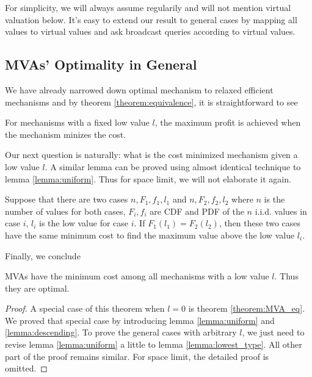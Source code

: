 For simplicity, we will always assume regularily and will not mention virtual
valuation below.  It's easy to extend our result to general cases by mapping
all values to virtual values and ask broadcast queries according to virtual
values.

\subsection{MVAs' Optimality in General}

We have already narrowed down optimal mechanism to
relaxed efficient mechanisms and by theorem \ref{theorem:equivalence},
it is straightforward to see

\begin{corollary}

For mechanisms with a fixed low value $l$, the maximum profit is
achieved when the mechanism minizes the cost.

\end{corollary}

Our next question is naturally: what is the cost minimized mechanism
given a low value $l$. 
A similar lemma can be proved using almost identical technique to lemma \ref{lemma:uniform}.
Thus for space limit, we will not elaborate it again. 

\begin{lemma}\label{lemma:lowest_type}
Suppose that there are two cases $n, F_1, f_1, l_1$ and $n, F_2, f_2, l_2$
where $n$ is the number of values for both cases, $F_i, f_i$ are CDF and PDF
of the $n$ i.i.d. values in case $i$, $l_i$ is the low value for case $i$.
If $F_1(l_1) = F_2(l_2)$, then these two cases have the same minimum cost
to find the maximum value above the low value $l_i$.
\end{lemma}

Finally, we conclude

\begin{theorem}

MVAs have the minimum cost among all mechanisms with a low value $l$. Thus
they are optimal.

\end{theorem}

\begin{proof}
A special case of this theorem when $l = 0$ is theorem \ref{theorem:MVA_eq}.
We proved that special case by introducing lemma \ref{lemma:uniform} and
\ref{lemma:descending}. To prove the general cases with arbitrary $l$, we just
need to revise lemma \ref{lemma:uniform} a little to lemma
\ref{lemma:lowest_type}. All other part of the proof remains similar. For space
limit, the detailed proof is omitted.
\end{proof}

